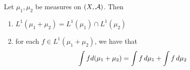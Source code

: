 \documentclass{book}
\begin{document}
	
	\begin{ex}  
		Let $\mu_1, \mu_2$ be measures on $(X, \mathcal{A})$. Then
		\begin{enumerate}
			\item $L^1(\mu_1 + \mu_2) = L^1(\mu_1) \cap L^1(\mu_2)$
			
			\item for each $f \in L^1(\mu_1 + \mu_2)$, we have that $$\int f d(\mu_1 + \mu_2) = \int f \, d \mu_1 + \int f \, d \mu_2$$
		\end{enumerate}
	\end{ex}
	
\end{document}
